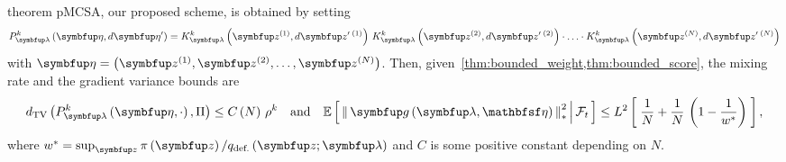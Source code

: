 
\begin{theoremEnd}{theorem}\label{thm:pmcsa}
  pMCSA, our proposed scheme, is obtained by setting
  {\small
  \begin{align*}
    P_{\vlambda}^k\left(\veta, d\veta^{\prime}\right)
    = 
    K_{\vlambda}^k\left(\vz^{(1)}, d\vz^{\prime\; (1)}\right)
    \,
    K_{\vlambda}^k\left(\vz^{(2)}, d\vz^{\prime\; (2)}\right)
    \cdot
    \ldots 
    \cdot
    K_{\vlambda}^k\left(\vz^{(N)}, d\vz^{\prime\; (N)}\right)
  \end{align*}
  }
  with \(\veta = \left(\vz^{(1)}, \vz^{(2)}, \ldots, \vz^{(N)}\right)\).
  Then, given~\cref{thm:bounded_weight,thm:bounded_score}, the mixing rate and the gradient variance bounds are
  {\small
  \begin{align*}
    \DTV{P_{\vlambda}^k\left(\veta, \cdot\right)}{\Pi}
    \leq
    C\left(N\right)\,{\rho^k}
    \quad\text{and}\quad
    \E{ \norm{ \vg\left(\vlambda, \rvveta\right) }^2_{*} \,\middle|\, \mathcal{F}_{t} }
    \leq
    L^2 \left[\; \frac{1}{N} + \frac{1}{N}\,\left(1 - \frac{1}{w^*}\right) \;\right],
  \end{align*}
  }
  where \(w^* = \sup_{\vz} \pi\left(\vz\right) / q_{\text{def.}}\left(\vz;\vlambda\right)\) and \(C\) is some positive constant depending on \(N\).
\end{theoremEnd}

